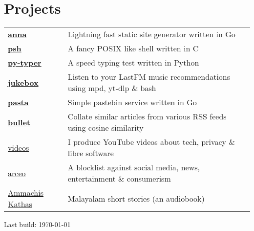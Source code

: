 \documentclass[letter,12pt]{article}
\begin{document}
\section{Projects}
\begin{tabularx}{\linewidth}{@{}l X@{}}
    \textbf{\href{https://github.com/anna-ssg/anna}{anna}} & Lightning fast static site generator written in Go \\
    \textbf{\href{https://github.com/psh-shell/psh}{psh}} & A fancy POSIX like shell written in C \\
    \textbf{\href{https://github.com/polarhive/py-typer}{py-typer}} & A speed typing test written in Python \\
    \textbf{\href{https://github.com/polarhive/jukebox}{jukebox}} & Listen to your LastFM music recommendations using mpd, yt-dlp \& bash \\
    \textbf{\href{https://polarhive.net/pasta}{pasta}} & Simple pastebin service written in Go \\
    \textbf{\href{https://polarhive.net/bullet}{bullet}} & Collate similar articles from various RSS feeds using cosine similarity    \\
    \href{https://polarhive.net/videos}{videos} & I produce YouTube videos about tech, privacy \& libre software \\
    \href{https://polarhive.net/arceo}{arceo} & A blocklist against social media, news, entertainment \& consumerism \\
    \href{https://polarhive.net/ammachiskathas}{Ammachis Kathas} & Malayalam short stories (an audiobook) \\
\end{tabularx}

\vfill
\href{https://github.com/polarhive/resume}{} Last build: \today
\end{document}
